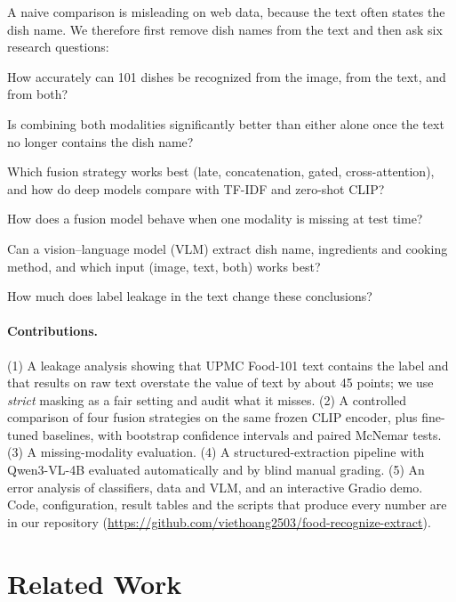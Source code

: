 \documentclass[11pt,a4paper]{article}
\begin{document}
A naive comparison is misleading on web data, because the text often states the dish name. We therefore first
remove dish names from the text and then ask six research questions:
\begin{description}[leftmargin=1.2cm,style=sameline]
  \item[RQ1] How accurately can 101 dishes be recognized from the image, from the text, and from both?
  \item[RQ2] Is combining both modalities significantly better than either alone once the text no longer
             contains the dish name?
  \item[RQ3] Which fusion strategy works best (late, concatenation, gated, cross-attention), and how do deep
             models compare with TF-IDF and zero-shot CLIP?
  \item[RQ4] How does a fusion model behave when one modality is missing at test time?
  \item[RQ5] Can a vision--language model (VLM) extract dish name, ingredients and cooking method, and which
             input (image, text, both) works best?
  \item[RQ6] How much does label leakage in the text change these conclusions?
\end{description}

\paragraph{Contributions.}
(1) A leakage analysis showing that UPMC Food-101 text contains the label and that results on raw text
overstate the value of text by about 45 points; we use \emph{strict} masking as a fair setting and audit what it
misses. (2) A controlled comparison of four fusion strategies on the same frozen CLIP encoder, plus fine-tuned
baselines, with bootstrap confidence intervals and paired McNemar tests. (3) A missing-modality evaluation.
(4) A structured-extraction pipeline with Qwen3-VL-4B evaluated automatically and by blind manual grading.
(5) An error analysis of classifiers, data and VLM, and an interactive Gradio demo. Code, configuration, result
tables and the scripts that produce every number are in our repository
(\url{https://github.com/viethoang2503/food-recognize-extract}).

\section{Related Work}
\end{document}
